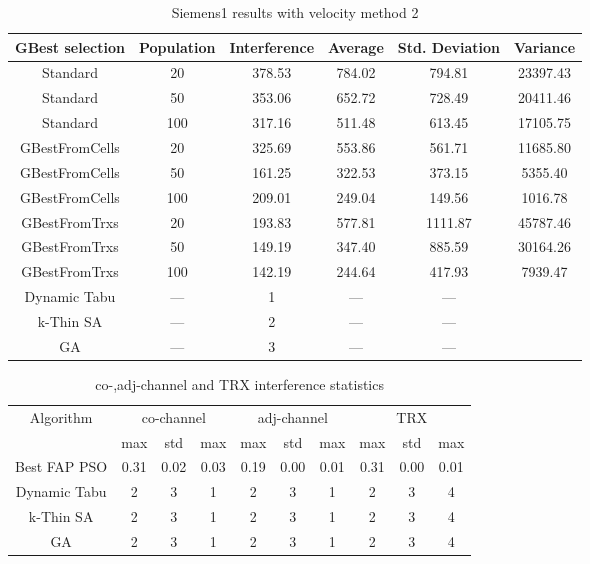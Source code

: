 \begin{table}[H]
\centering
	\begin{tabular}{cccccc}
	\toprule
    GBest selection & Population & Interference & Average & Std. Deviation & Variance \\
    \midrule
    Standard & 20 & 378.53 & 784.02 & 794.81 & 23397.43\\
    Standard & 50 & 353.06 & 652.72 & 728.49 & 20411.46\\
    Standard & 100 & 317.16 & 511.48 & 613.45 & 17105.75\\
    GBestFromCells & 20 & 325.69 & 553.86 & 561.71 & 11685.80\\
    GBestFromCells & 50 & 161.25 & 322.53 & 373.15 & 5355.40\\
    GBestFromCells & 100 & 209.01 & 249.04 & 149.56 & 1016.78\\
    GBestFromTrxs & 20 & 193.83 & 577.81 & 1111.87 & 45787.46\\
    GBestFromTrxs & 50 & 149.19 & 347.40 & 885.59 & 30164.26\\
    GBestFromTrxs & 100 & 142.19 & 244.64 & 417.93 & 7939.47\\
    Dynamic Tabu & --- & 1 & --- & --- \\
    k-Thin SA & --- & 2 & --- & --- \\
    GA & --- & 3 & --- & --- \\
    \bottomrule
	\end{tabular}
\caption{Siemens1 results with velocity method 2}
\label{tab:siem2m2}
\end{table}
\begin{table}[H]
\centering
	\begin{tabular}{cccccccccc}
	\toprule
    Algorithm & \multicolumn{3}{c}{co-channel} & \multicolumn{3}{c}{adj-channel} & \multicolumn{3}{c}{TRX}\\
              & max & std & max
              & max & std & max
              & max & std & max\\
    \midrule
    Best FAP PSO & 0.31 & 0.02 & 0.03 & 0.19 & 0.00 & 0.01 & 0.31 & 0.00 & 0.01\\ 
    Dynamic Tabu & 2 & 3 & 1 & 2 & 3 & 1 & 2 & 3 & 4\\\hline
    k-Thin SA & 2 & 3 & 1 & 2 & 3 & 1 & 2 & 3 & 4\\\hline
    GA & 2 & 3 & 1 & 2 & 3 & 1 & 2 & 3 & 4\\\hline
    \bottomrule
	\end{tabular}
\caption{co-,adj-channel and TRX interference statistics}
\label{tab:stats-siem2m1}
\end{table}
